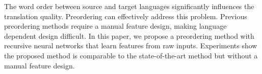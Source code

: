 The word order between source and target languages significantly influences the translation quality. Preordering can effectively address this problem. Previous preordering methods require a manual feature design, making language dependent design difficult. In this paper, we propose a preordering method with recursive neural networks that learn features from raw inputs. Experiments show the proposed method is comparable to the state-of-the-art method but without a manual feature design.
